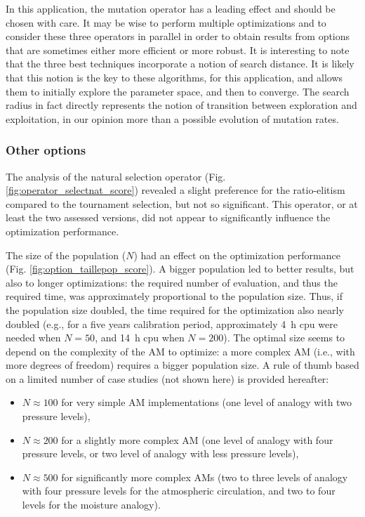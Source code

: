 \documentclass{ametsoc}
\begin{document}
In this application, the mutation operator has a leading effect and should be chosen with care. It may be wise to perform multiple optimizations and to consider these three operators in parallel in order to obtain results from options that are sometimes either more efficient or more robust. It is interesting to note that the three best techniques incorporate a notion of search distance. It is likely that this notion is the key to these algorithms, for this application, and allows them to initially explore the parameter space, and then to converge. The search radius in fact directly represents the notion of transition between exploration and exploitation, in our opinion more than a possible evolution of mutation rates.


\subsubsection{Other options}

The analysis of the natural selection operator (Fig. \ref{fig:operator_selectnat_score}) revealed a slight preference for the ratio-elitism compared to the tournament selection, but not so significant. This operator, or at least the two assessed versions, did not appear to significantly influence the optimization performance.

The size of the population ($N$) had an effect on the optimization performance (Fig. \ref{fig:option_taillepop_score}). A bigger population led to better results, but also to longer optimizations: the required number of evaluation, and thus the required time, was approximately proportional to the population size. Thus, if the population size doubled, the time required for the optimization also nearly doubled (e.g., for a five years calibration period, approximately 4~h cpu were needed when $N = 50$, and 14~h cpu when $N = 200$). The optimal size seems to depend on the complexity of the AM to optimize: a more complex AM (i.e., with more degrees of freedom) requires a bigger population size. A rule of thumb based on a limited number of case studies (not shown here) is provided hereafter:

\begin{itemize}
	\item $N\approx100$ for very simple AM implementations (one level of analogy with two pressure levels),
	\item $N\approx200$ for a slightly more complex AM (one level of analogy with four pressure levels, or two level of analogy with less pressure levels),
	\item $N\approx500$ for significantly more complex AMs (two to three levels of analogy with four pressure levels for the atmospheric circulation, and two to four levels for the moisture analogy).
\end{itemize}
\end{document}
